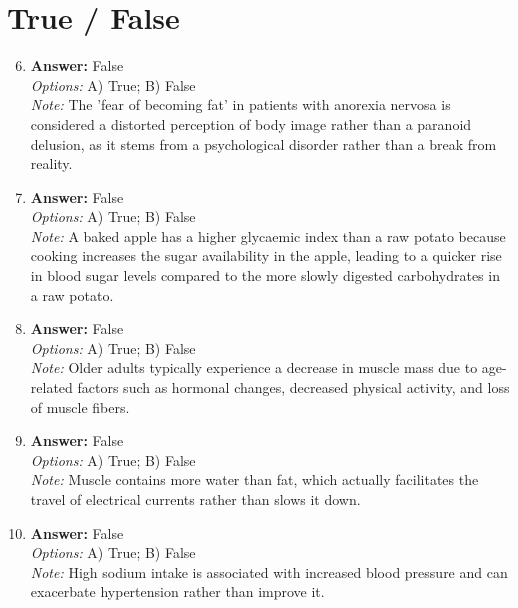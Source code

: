 \documentclass[12pt]{article}
\begin{document}
\section*{True / False}
\begin{enumerate}[label=\arabic*.]
\setcounter{enumi}{5}
\item \textbf{Answer:} False
\\ \textit{Options:} A) True; B) False
\\ \textit{Note:} The 'fear of becoming fat' in patients with anorexia nervosa is considered a distorted perception of body image rather than a paranoid delusion, as it stems from a psychological disorder rather than a break from reality.
\item \textbf{Answer:} False
\\ \textit{Options:} A) True; B) False
\\ \textit{Note:} A baked apple has a higher glycaemic index than a raw potato because cooking increases the sugar availability in the apple, leading to a quicker rise in blood sugar levels compared to the more slowly digested carbohydrates in a raw potato.
\item \textbf{Answer:} False
\\ \textit{Options:} A) True; B) False
\\ \textit{Note:} Older adults typically experience a decrease in muscle mass due to age-related factors such as hormonal changes, decreased physical activity, and loss of muscle fibers.
\item \textbf{Answer:} False
\\ \textit{Options:} A) True; B) False
\\ \textit{Note:} Muscle contains more water than fat, which actually facilitates the travel of electrical currents rather than slows it down.
\item \textbf{Answer:} False
\\ \textit{Options:} A) True; B) False
\\ \textit{Note:} High sodium intake is associated with increased blood pressure and can exacerbate hypertension rather than improve it.
\end{enumerate}
\end{document}
